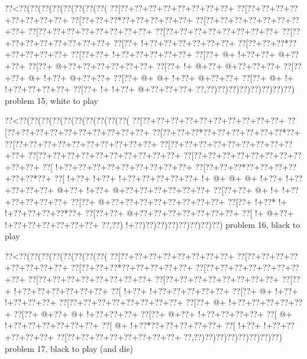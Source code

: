 \vbox{\vbox{\goo
\0??<\0??(\0??(\0??(\0??(\0??(\0??(\0??(\0??(
\0??[\0??+\0??+\0??+\0??+\0??+\0??+\0??+\0??+
\0??[\0??+\0??+\0??+\0??+\0??+\0??+\0??+\0??+
\0??[\0??+\0??+\0??*\0??+\0??+\0??+\0??+\0??+
\0??[\0??+\0??+\0??+\0??+\0??+\0??+\0??+\0??+
\0??[\0??+\0??+\0??+\0??+\0??+\0??+\0??+\0??+
\0??[\0??+\0??+\0??+\0??+\0??+\0??+\0??+\0??+
\0??[\0??+\0??+\0??+\0??+\0??+\0??+\0??+\0??+
\0??[\0??+\- !+\0??+\0??+\0??+\0??+\0??+\0??+
\0??[\0??+\0??+\0??*\0??+\0??+\0??+\0??+\0??+
\0??[\0??+\0??+\- !+\0??+\0??+\0??+\0??+\0??+
\0??[\0??+\- @+\- !+\0??+\0??+\- @+\0??+\0??+
\0??[\0??+\- @+\0??+\0??+\0??+\0??+\0??+\0??+
\0??[\0??+\- !+\- @+\0??+\- @+\0??+\0??+\0??+
\0??[\0??+\0??+\- @+\- !+\0??+\- @+\0??+\0??+
\0??[\0??+\- @+\- @+\- !+\0??+\- @+\0??+\0??+
\0??[\0??+\- @+\- !+\- !+\0??+\0??+\0??+\0??+
\0??[\0??+\- !+\- !+\0??+\- @+\0??+\0??+\0??+
\0??,\0??)\0??)\0??)\0??)\0??)\0??)\0??)\0??)
}
\hfil problem 15, white to play\hfil\break
}

\vbox{\vbox{\goo
\0??<\0??(\0??(\0??(\0??(\0??(\0??(\0??(\0??(\0??(\0??(
\0??[\0??+\0??+\0??+\0??+\0??+\0??+\0??+\0??+\0??+\0??+
\0??[\0??+\0??+\0??+\0??+\0??+\0??+\0??+\0??+\0??+\0??+
\0??[\0??+\0??+\0??*\0??+\0??+\0??+\0??+\0??+\0??*\0??+
\0??[\0??+\0??+\0??+\0??+\0??+\0??+\0??+\0??+\0??+\0??+
\0??[\0??+\0??+\0??+\0??+\0??+\0??+\0??+\0??+\0??+\0??+
\0??[\0??+\0??+\0??+\0??+\0??+\0??+\0??+\0??+\0??+\0??+
\0??[\0??+\0??+\0??+\0??+\0??+\0??+\0??+\0??+\0??+\0??+
\0??[\- !+\0??+\0??+\0??+\0??+\0??+\0??+\0??+\0??+\0??+
\0??[\0??+\0??+\0??*\0??+\0??+\0??+\0??+\0??+\0??*\0??+
\0??[\- !+\0??+\- !+\0??+\- !+\0??+\0??+\0??+\0??+\0??+
\- !+\- @+\- @+\- @+\- !+\0??+\- !+\0??+\0??+\0??+\0??+
\- @+\0??+\- !+\0??+\- @+\0??+\0??+\0??+\0??+\0??+\0??+
\0??[\0??+\0??+\- @+\- !+\- !+\0??+\0??+\0??+\0??+\0??+
\0??[\0??+\- @+\0??+\0??+\0??+\0??+\0??+\0??+\0??+\0??+
\0??[\0??+\- !+\0??*\- !+\- !+\0??+\0??+\0??+\0??*\0??+
\0??[\0??+\0??+\- @+\0??+\0??+\0??+\0??+\0??+\0??+\0??+
\0??[\- !+\- @+\0??+\- !+\0??+\0??+\0??+\0??+\0??+\0??+
\0??,\0??)\- !+\0??)\0??)\0??)\0??)\0??)\0??)\0??)\0??)
}
\hfil problem 16, black to play\hfil\break
}

\vbox{\vbox{\goo
\0??<\0??(\0??(\0??(\0??(\0??(\0??(\0??(\0??(
\0??[\0??+\0??+\0??+\0??+\0??+\0??+\0??+\0??+
\0??[\0??+\0??+\0??+\0??+\0??+\0??+\0??+\0??+
\0??[\0??+\0??+\0??*\0??+\0??+\0??+\0??+\0??+
\0??[\0??+\0??+\0??+\0??+\0??+\0??+\0??+\0??+
\0??[\0??+\0??+\0??+\0??+\0??+\0??+\0??+\0??+
\0??[\0??+\0??+\0??+\0??+\0??+\0??+\0??+\0??+
\0??[\0??+\- !+\0??+\0??+\0??+\0??+\0??+\0??+
\0??[\- !+\0??+\- !+\0??+\0??+\0??+\0??+\0??+
\0??[\0??+\- @+\- !+\0??+\- !+\0??+\0??+\0??+
\0??[\0??+\0??+\0??+\0??+\0??+\0??+\0??+\0??+
\0??[\0??+\- @+\- !+\0??+\0??+\0??+\0??+\0??+
\0??[\0??+\- @+\0??+\- @+\- !+\0??+\0??+\0??+
\0??[\0??+\- @+\0??+\- !+\0??+\0??+\0??+\0??+
\0??[\- @+\- !+\0??+\0??+\0??+\0??+\0??+\0??+
\0??[\- @+\- !+\0??*\0??+\0??+\0??+\0??+\0??+
\0??[\- !+\0??+\- !+\0??+\0??+\0??+\0??+\0??+
\0??[\0??+\0??+\0??+\0??+\0??+\0??+\0??+\0??+
\0??,\0??)\0??)\0??)\0??)\0??)\0??)\0??)\0??)
}
\hfil problem 17, black to play (and die)\hfil\break
}

